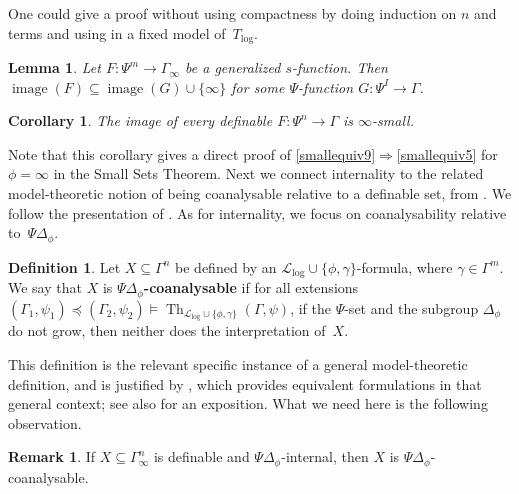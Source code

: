\documentclass[11pt]{amsart}
\theoremstyle{plain}
\newtheorem{lemma}[thm]{Lemma}
\newtheorem{cor}[thm]{Corollary}
\theoremstyle{definition}
\newtheorem*{def*}{Definition}
\newtheorem{remark}[thm]{Remark}
\numberwithin{equation}{section}
\newcommand\calL{\mathcal{L}}
\newcommand\0{\varnothing}
\DeclareMathOperator\image{image}
\DeclareMathOperator\Th{Th}
\begin{document}
\noindent
One could give a proof without using compactness by doing induction on $n$ and terms and using \cite[Theorem~6.6 and Corollary~6.7]{GehretACTlog} in a fixed model of~$T_{\log}$.


\begin{lemma}\label{lem_gensfunprimdset}
Let $F \colon \Psi^m \to \Gamma_\infty$ be a generalized $s$-function. Then $\image(F)\subseteq\image(G)\cup\{\infty\}$ for some $\Psi$-function $G\colon \Psi^I\to \Gamma$.
\end{lemma} 
\begin{cor}\label{cor_deffunctiondset}
The image of every definable $F \colon \Psi^n \to \Gamma$ is $\infty$-small.
\end{cor}

\noindent
Note that this corollary gives a direct proof of \eqref{smallequiv9}$\Rightarrow$\eqref{smallequiv5} for $\phi = \infty$ in the Small Sets Theorem.
Next we connect internality to the related model-theoretic notion of being coanalysable relative to a definable set, from \cite{herwighrushovskimacpherson}.
We follow the presentation of \cite{adh-dimension}.
As for internality, we focus on coanalysability relative to~$\Psi\Delta_{\phi}$.

\begin{def*}
Let $X\subseteq\Gamma^n$ be defined by an $\calL_{\log}\cup\{\phi,\gamma\}$-formula, where $\gamma\in\Gamma^m$.
We say that $X$ is \textbf{$\Psi\Delta_{\phi}$-coanalysable} if for all extensions
$(\Gamma_1,\psi_1)\preccurlyeq(\Gamma_2,\psi_2)\models \Th_{\calL_{\log}\cup\{\phi,\gamma\}}(\Gamma,\psi)$, if the $\Psi$-set and the subgroup $\Delta_{\phi}$ do not grow, then neither does the interpretation of~$X$.
\end{def*}



\noindent
This definition is the relevant specific instance of a general model-theoretic definition, and is justified by \cite[Proposition~2.4]{herwighrushovskimacpherson}, which provides equivalent formulations in that general context; see also \cite[Section~6]{adh-dimension} for an exposition.
What we need here is the following observation.
\begin{remark}\label{rem_coanal}
If $X \subseteq \Gamma^{n}_{\infty}$ is definable and
    $\Psi\Delta_{\phi}$-internal, then $X$ is $\Psi\Delta_{\phi}$-coanalysable.
\end{remark}
\end{document}
